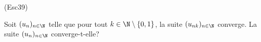 \begin{tiny}(Esc39)\end{tiny} Soit $(u_n)_{n\in \N}$ telle que pour tout $k \in \N\setminus\left\lbrace 0, 1 \right\rbrace$, la suite $(u_{nk})_{n\in \N}$ converge. La suite $(u_n)_{n\in \N}$ converge-t-elle?
